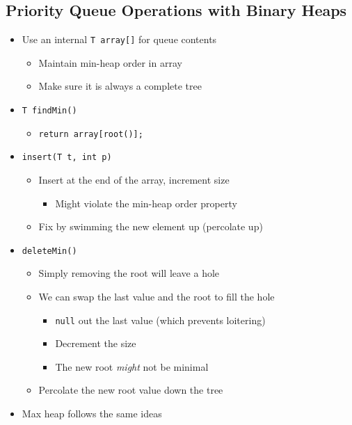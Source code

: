 \documentclass[
  10pt,
  english,
  letterpaper,
,tablecaptionabove
]{scrartcl}
\newcommand{\passthrough}[1]{#1}
\providecommand{\tightlist}{%
  \setlength{\itemsep}{0pt}\setlength{\parskip}{0pt}}
\begin{document}
\hypertarget{priority-queue-operations-with-binary-heaps}{%
\subsection{Priority Queue Operations with Binary
Heaps}\label{priority-queue-operations-with-binary-heaps}}

\begin{itemize}
\tightlist
\item
  Use an internal \passthrough{\lstinline!T array[]!} for queue contents

  \begin{itemize}
  \tightlist
  \item
    Maintain min-heap order in array
  \item
    Make sure it is always a complete tree
  \end{itemize}
\item
  \passthrough{\lstinline!T findMin()!}

  \begin{itemize}
  \tightlist
  \item
    \passthrough{\lstinline!return array[root()];!}
  \end{itemize}
\item
  \passthrough{\lstinline!insert(T t, int p)!}

  \begin{itemize}
  \tightlist
  \item
    Insert at the end of the array, increment size

    \begin{itemize}
    \tightlist
    \item
      Might violate the min-heap order property
    \end{itemize}
  \item
    Fix by swimming the new element up (percolate up)
  \end{itemize}
\item
  \passthrough{\lstinline!deleteMin()!}

  \begin{itemize}
  \tightlist
  \item
    Simply removing the root will leave a hole
  \item
    We can swap the last value and the root to fill the hole

    \begin{itemize}
    \tightlist
    \item
      \passthrough{\lstinline!null!} out the last value (which prevents
      loitering)
    \item
      Decrement the size
    \item
      The new root \emph{might} not be minimal
    \end{itemize}
  \item
    Percolate the new root value down the tree
  \end{itemize}
\item
  Max heap follows the same ideas
\end{itemize}
\end{document}
